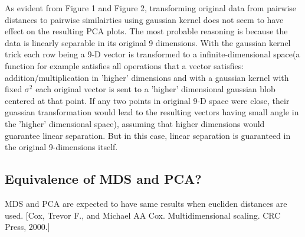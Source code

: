 \documentclass{article}
\begin{document}
As evident from Figure 1 and Figure 2, transforming original data from pairwise distances to pairwise similairties using gaussian kernel does not seem to have effect on the resulting PCA plots. The most probable reasoning is because the data is linearly separable in its original 9 dimensions. With the gaussian kernel trick each row being a 9-D vector is transformed to a infinite-dimensional space(a function for example satisfies all operations that a vector satisfies: addition/multiplication in 'higher' dimensions and with a gaussian kernel with fixed $\sigma^2$ each original vector is sent to a 'higher' dimensional gaussian blob centered at that point. If any two points in original 9-D space were close, their guassian transformation would lead to the resulting vectors having small angle in the 'higher' dimensional space), assuming that higher dimensions would guarantee linear separation. But in this case, linear separation is guaranteed in the original 9-dimensions itself.

\subsection{Equivalence of MDS and PCA?}
MDS and PCA are expected to have same results when eucliden distances are used.
[Cox, Trevor F., and Michael AA Cox. Multidimensional scaling. CRC Press, 2000.]
\end{document}
